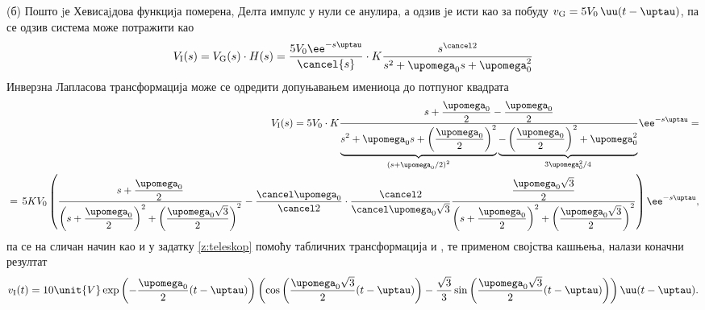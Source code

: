 (б)
Пошто jе Хевисаjдова функциjа померена, Делта импулс у нули се анулира, а одзив jе исти као за побуду
$v_{\rm G} = 5 V_0 \, \uu(t - \uptau)$, па се одзив система може потражити као 
\begin{eqnarray}
    V_{\rm I}(s) = 
    V_{\rm G}(s) \cdot H(s)
    =
    \dfrac{5 V_0 \ee^{-s\uptau}}{\cancel{s}} \cdot 
    K\dfrac{s^{\cancel2}}{s^2 + \upomega_0 s + \upomega_0^2 }
\end{eqnarray}
Инверзна Лапласова трансформација може се одредити допуњавањем имениоца до потпуног квадрата
\begin{eqnarray*}
    && V_{\rm I}(s)=5 V_0 \cdot 
    K\dfrac{
        s + \dfrac{\upomega_0}{2} - \dfrac{\upomega_0}{2}
    }{
    \underbrace{s^2 + \upomega_0 s + \left(\dfrac{\upomega_0}{2}\right)^2}_{
        \left(
            s + \upomega_0/2
        \right)^2
    } 
    \underbrace{
    - \left(\dfrac{\upomega_0}{2}\right)^2  + \upomega_0^2 }_{ {3\upomega_0^2}/{4} } 
    }
    \ee^{-s\uptau} = \\
    &=& \hspace*{-2mm} 5KV_0 
        \left(
            \dfrac{
            s + \dfrac{\upomega_0}{2} 
            }{
               \left(s + \dfrac{\upomega_0}2 \right)^2 + \left( \dfrac{\upomega_0 \sqrt 3}{2} \right)^2
            }
            - \dfrac{\cancel \upomega_0}{\cancel 2}
            \cdot
            \dfrac{\cancel 2}{\cancel \upomega_0 \sqrt3}
            \dfrac{
                \dfrac{\upomega_0 \sqrt 3}{2}
            }{
                \left(s + \dfrac{\upomega_0}2 \right)^2 + \left( \dfrac{\upomega_0 \sqrt 3}{2} \right)^2
            }
    \right)
    \ee^{-s\uptau},
\end{eqnarray*}
па се на сличан начин као и у задатку \ref{z:teleskop} помоћу табличних трансформација 
 и , те применом својства кашњења, налази коначни резултат 
\begin{equation}
    v_{\rm I}(t) = 
    10\unit{V}
    \exp\left(- \dfrac{\upomega_0}{2} (t-\uptau)\right)
    \left( 
        \cos\left( \dfrac{\upomega_0\sqrt3}{2}(t-\uptau) \right)
        -
        \dfrac{\sqrt 3}{3}
        \sin\left( \dfrac{\upomega_0\sqrt3}{2}(t-\uptau) \right)
    \right) \uu(t-\uptau).
\end{equation}